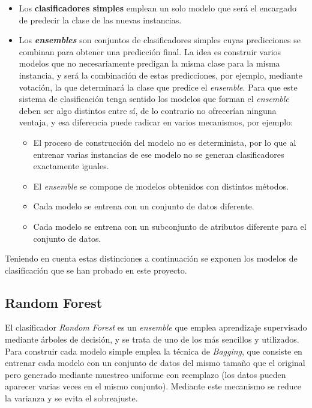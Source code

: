 \begin{itemize}
	\item Los \textbf{clasificadores simples} emplean un solo modelo que será el encargado de predecir la clase de las nuevas instancias. 
	\item Los \textbf{\textit{ensembles}} son conjuntos de clasificadores simples cuyas predicciones se combinan para obtener una predicción final. La idea es construir varios modelos que no necesariamente predigan la misma clase para la misma instancia, y será la combinación de estas predicciones, por ejemplo, mediante votación, la que determinará la clase que predice el \textit{ensemble}. Para que este sistema de clasificación tenga sentido los modelos que forman el \textit{ensemble} deben ser algo distintos entre sí, de lo contrario no ofrecerían ninguna ventaja, y esa diferencia puede radicar en varios mecanismos, por ejemplo: 
	\begin{itemize}
		\item El proceso de construcción del modelo no es determinista, por lo que al entrenar varias instancias de ese modelo no se generan clasificadores exactamente iguales. 
		\item El \textit{ensemble} se compone de modelos obtenidos con distintos métodos. 
		\item Cada modelo se entrena con un conjunto de datos diferente.
		\item Cada modelo se entrena con un subconjunto de atributos diferente para el conjunto de datos. 
	\end{itemize} 
\end{itemize} 

Teniendo en cuenta estas distinciones a continuación se exponen los modelos de clasificación que se han probado en este proyecto.

\subsection{Random Forest}

El clasificador \textit{Random Forest} es un \textit{ensemble} que emplea aprendizaje supervisado mediante árboles de decisión, y se trata de uno de los más sencillos y utilizados. Para construir cada modelo simple emplea la técnica de \textit{Bagging}, que consiste en entrenar cada modelo con un conjunto de datos del mismo tamaño que el original pero generado mediante muestreo uniforme con reemplazo (los datos pueden aparecer varias veces en el mismo conjunto). Mediante este mecanismo se reduce la varianza y se evita el sobreajuste. 

